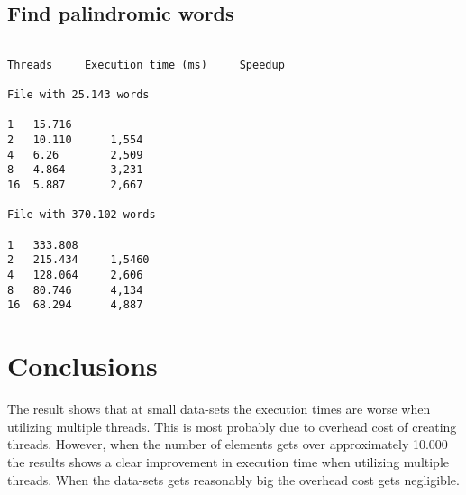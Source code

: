 \documentclass{article}
\begin{document}
\clearpage
\subsection{Find palindromic words }

\begin{verbatim}

Threads     Execution time (ms)     Speedup

File with 25.143 words

1   15.716
2   10.110      1,554
4   6.26        2,509
8   4.864       3,231 
16  5.887       2,667

File with 370.102 words 

1   333.808		
2   215.434     1,5460
4   128.064     2,606
8   80.746      4,134
16  68.294      4,887

\end{verbatim}

\section{Conclusions}

The result shows that at small data-sets the execution times are worse when utilizing multiple threads. This is most probably due to overhead cost of creating threads. However, when the number of elements gets over approximately 10.000 the results shows a clear improvement in execution time when utilizing multiple threads. When the data-sets gets reasonably big the overhead cost gets negligible. 
\end{document}
